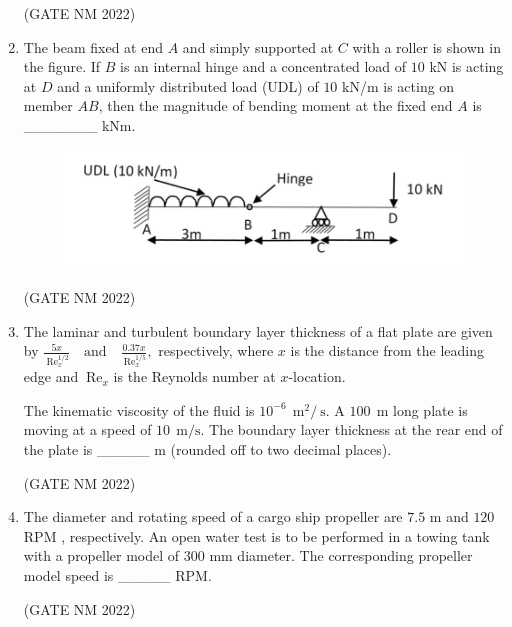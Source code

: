 \documentclass[journal,12pt,onecolumn]{IEEEtran}
\theoremstyle{remark}
\begin{document}
\begin{enumerate}
\hfill(GATE NM 2022)







\item  The beam fixed at end $A$ and simply supported at $C$ with a roller is shown in the figure.  
If $B$  is an internal hinge and a concentrated load of $10$ kN is acting at $D$ and a uniformly distributed load (UDL) of $10$ kN/m  is acting on member $AB$, then the magnitude of bending moment at the fixed end $A$ is \_\_\_\_\_\_\_ kNm.

\begin{figure}[h]
	\centering
    \includegraphics[width=0.6\columnwidth]{fig4}
	\caption{}
	\label{fig:placeholder}
\end{figure}

\hfill(GATE NM 2022)







\item  The laminar and turbulent boundary layer thickness of a flat plate are given by  
$
\frac{5x}{\ \text{Re}_x^{1/2}}
\quad \text{and} \quad
\frac{0.37x}{\ \text{Re}_x^{1/5}},
$
respectively, where $x$ is the distance from the leading edge and $\ \text{Re}_x$ is the Reynolds number at $x$-location.  

The kinematic viscosity of the fluid is $10^{-6}~\ \text{m}^2/\ \text{s}$.  
A $100~\ \text{m}$  long plate is moving at a speed of $10~\ \text{m/s}$.  
The boundary layer thickness at the rear end of the plate is \_\_\_\_\_ m (rounded off to two decimal places).

\hfill(GATE NM 2022)






\item  The diameter and rotating speed of a cargo ship propeller are $7.5$ m  and $120$ RPM , respectively.  
An open water test is to be performed in a towing tank with a propeller model of 300 mm  diameter.  
The corresponding propeller model speed is \_\_\_\_\_ RPM.

\hfill(GATE NM 2022)

















\end{enumerate}
\end{document}
